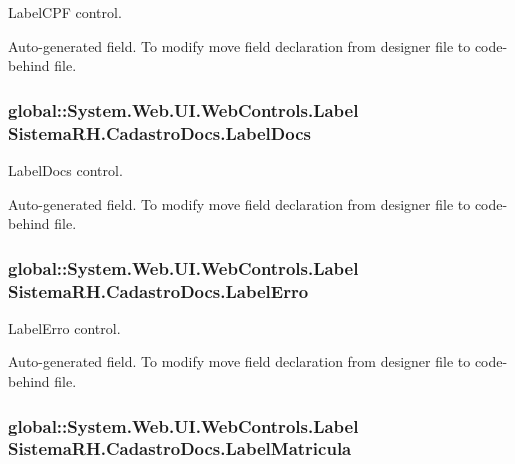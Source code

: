 LabelCPF control. 

Auto-\/generated field. To modify move field declaration from designer file to code-\/behind file. \hypertarget{class_sistema_r_h_1_1_cadastro_docs_af3a629db4b0544fe42def4930a20fe8f}{
\subsubsection[{LabelDocs}]{\setlength{\rightskip}{0pt plus 5cm}global::System.Web.UI.WebControls.Label {\bf SistemaRH.CadastroDocs.LabelDocs}}}
\label{class_sistema_r_h_1_1_cadastro_docs_af3a629db4b0544fe42def4930a20fe8f}


LabelDocs control. 

Auto-\/generated field. To modify move field declaration from designer file to code-\/behind file. \hypertarget{class_sistema_r_h_1_1_cadastro_docs_a33caea05605b414e0ea06b9220399f61}{
\subsubsection[{LabelErro}]{\setlength{\rightskip}{0pt plus 5cm}global::System.Web.UI.WebControls.Label {\bf SistemaRH.CadastroDocs.LabelErro}}}
\label{class_sistema_r_h_1_1_cadastro_docs_a33caea05605b414e0ea06b9220399f61}


LabelErro control. 

Auto-\/generated field. To modify move field declaration from designer file to code-\/behind file. \hypertarget{class_sistema_r_h_1_1_cadastro_docs_a1d18bcded11290fd597a761a4f1bd9bb}{
\subsubsection[{LabelMatricula}]{\setlength{\rightskip}{0pt plus 5cm}global::System.Web.UI.WebControls.Label {\bf SistemaRH.CadastroDocs.LabelMatricula}}}
\label{class_sistema_r_h_1_1_cadastro_docs_a1d18bcded11290fd597a761a4f1bd9bb}


